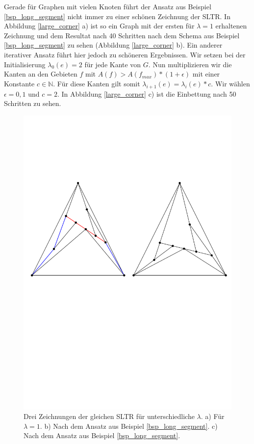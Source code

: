 \begin{example}\label{bsp_large_corner} 
Gerade für Graphen mit vielen Knoten führt der Ansatz aus Beispiel \ref{bsp_long_segment} nicht immer zu einer schönen Zeichnung der SLTR. In Abbildung \ref{large_corner} a) ist so ein Graph mit der ersten für $\lambda=1$ erhaltenen Zeichnung und dem Resultat nach 40 Schritten nach dem Schema aus Beispiel \ref{bsp_long_segment} zu sehen (Abbildung \ref{large_corner} b). Ein anderer iterativer Ansatz führt hier jedoch zu schöneren Ergebnissen. Wir setzen bei der Initialisierung $\lambda_0(e)=2$ für jede Kante von $G$. Nun multiplizieren wir die Kanten an den Gebieten $f$ mit $A(f) > A(f_{max})*(1+\epsilon)$ mit einer Konstante $c \in \mathbb{N}$. Für diese Kanten gilt somit $\lambda_{i+1}(e) = \lambda_{i}(e)*c$. Wir wählen $\epsilon = 0,1$ und $c=2$. In Abbildung \ref{large_corner} c) ist die Einbettung nach 50 Schritten zu sehen.
\end{example}

\begin{figure}[h]
	\centering
  \includegraphics[width=1\textwidth]{example1_vis.pdf}
  \caption{Drei Zeichnungen der gleichen SLTR für unterschiedliche $\lambda$. a) Für $\lambda=1$. b) Nach dem Ansatz aus Beispiel \ref{bsp_long_segment}. c) Nach dem Ansatz aus Beispiel \ref{bsp_long_segment}.}
  \label{long_segment}
\end{figure}

